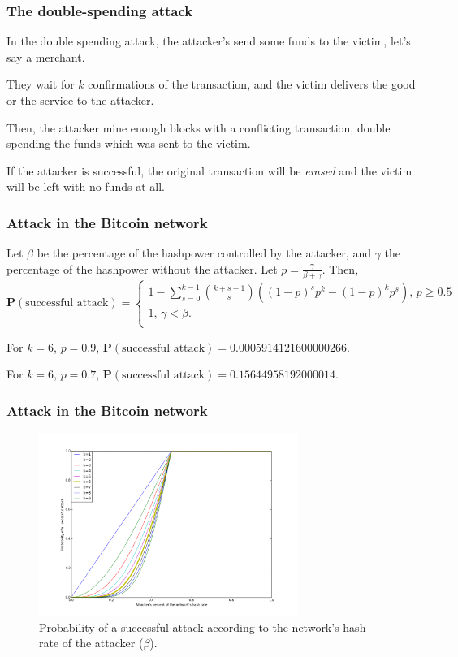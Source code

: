 \documentclass{beamer}
\begin{document}
\begin{frame}
\frametitle{The double-spending attack}

In the double spending attack, the attacker's send some funds to the victim, let's say a merchant.

They wait for $k$ confirmations of the transaction, and the victim delivers the good or the service to the attacker.

Then, the attacker mine enough blocks with a conflicting transaction, double spending the funds which was sent to the victim.

If the attacker is successful, the original transaction will be \textit{erased} and the victim will be left with no funds at all.

\end{frame}


\begin{frame}
\frametitle{Attack in the Bitcoin network}

\begin{theorem}
	Let $\beta$ be the percentage of the hashpower controlled by the attacker, and $\gamma$ the percentage of the hashpower without the attacker. Let $p = \frac{\gamma}{\beta + \gamma}$. Then,
$$
\mathbf{P}(\text{successful attack}) =
\begin{cases}
	1 - \sum_{s=0}^{k-1} \binom{k+s-1}{s} \left( (1-p)^s p^k - (1-p)^k p^s \right) \text{, $p \geq 0.5$} \\
	1 \text{, $\gamma < \beta$}.\\
\end{cases}
$$
\end{theorem}

For $k=6$, $p=0.9$, $\mathbf{P}(\text{successful attack}) = 0.0005914121600000266$.

For $k=6$, $p=0.7$, $\mathbf{P}(\text{successful attack}) = 0.15644958192000014$.

\end{frame}


\begin{frame}
\frametitle{Attack in the Bitcoin network}
\begin{figure}
\includegraphics[width=0.75\textwidth]{./images01/fig-bitcoin-attack.png}
\caption{Probability of a successful attack according to the network's hash rate of the attacker ($\beta$).}
\end{figure}
\end{frame}
\end{document}
